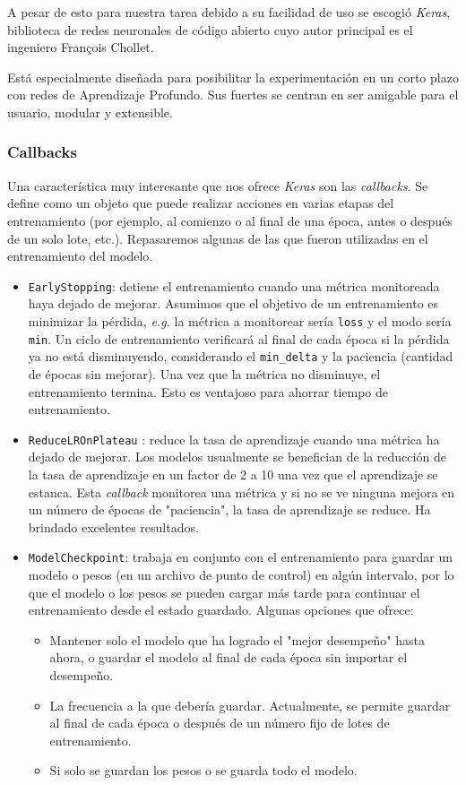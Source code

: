 \documentclass[a4paper,12pt]{article}
\begin{document}
A pesar de esto para nuestra tarea debido a su facilidad de uso se escogió \textit{Keras}, biblioteca de redes neuronales de código abierto cuyo autor principal es el ingeniero François Chollet.

Está especialmente diseñada para posibilitar la experimentación en un corto plazo con redes de Aprendizaje Profundo. Sus fuertes se centran en ser amigable para el usuario, modular y extensible. \citep{keras-wiki}

\subsubsection{Callbacks}
Una característica muy interesante que nos ofrece \textit{Keras} son las \textit{callbacks}. Se define como un objeto que puede realizar acciones en varias etapas del entrenamiento (por ejemplo, al comienzo o al final de una época, antes o después de un solo lote, etc.). Repasaremos algunas de las que fueron utilizadas en el entrenamiento del modelo. \citep{callbacks}

\begin{itemize}[noitemsep, topsep=2pt]
	\item \texttt{EarlyStopping}: detiene el entrenamiento cuando una métrica monitoreada haya dejado de mejorar. Asumimos que el objetivo de un entrenamiento es minimizar la pérdida, \textit{e.g.} la métrica a monitorear sería \texttt{loss} y el modo sería \texttt{min}. Un ciclo de entrenamiento verificará al final de cada época si la pérdida ya no está disminuyendo, considerando el \texttt{min\_delta} y la paciencia (cantidad de épocas sin mejorar). Una vez que la métrica no disminuye, el entrenamiento termina. Esto es ventajoso para ahorrar tiempo de entrenamiento.
	\item \texttt{ReduceLROnPlateau} \label{plateau}: reduce la tasa de aprendizaje cuando una métrica ha dejado de mejorar. Los modelos usualmente se benefician de la reducción de la tasa de aprendizaje en un factor de 2 a 10 una vez que el aprendizaje se estanca. Esta \textit{callback} monitorea una métrica y si no se ve ninguna mejora en un número de épocas de "paciencia", la tasa de aprendizaje se reduce. Ha brindado excelentes resultados.
	\item \texttt{ModelCheckpoint}: trabaja en conjunto con el entrenamiento para guardar un modelo o pesos (en un archivo de punto de control) en algún intervalo, por lo que el modelo o los pesos se pueden cargar más tarde para continuar el entrenamiento desde el estado guardado.
	Algunas opciones que ofrece:
	\begin{itemize}[noitemsep, topsep=2pt]
		\item Mantener solo el modelo que ha logrado el "mejor desempeño" hasta ahora, o guardar el modelo al final de cada época sin importar el desempeño.
		\item La frecuencia a la que debería guardar. Actualmente, se permite guardar al final de cada época o después de un número fijo de lotes de entrenamiento.
		\item Si solo se guardan los pesos o se guarda todo el modelo.
	\end{itemize}
\end{itemize}
\end{document}
